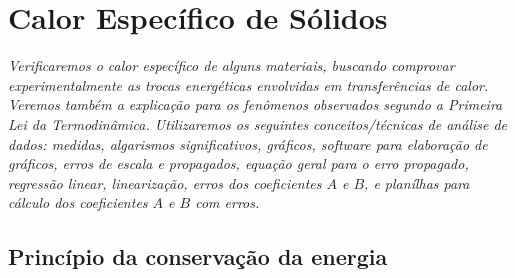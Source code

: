 \chapter{Calor Específico de Sólidos} %
\label{Chap:CalorEspecifico}        %

\begin{fullwidth}\it
Verificaremos o calor específico de alguns materiais, buscando comprovar experimentalmente as trocas energéticas envolvidas em transferências de calor. Veremos também a explicação para os fenômenos observados segundo a Primeira Lei da Termodinâmica. Utilizaremos os seguintes conceitos/técnicas de análise de dados: medidas, algarismos significativos, gráficos, software para elaboração de gráficos, erros de escala e propagados, equação geral para o erro propagado, regressão linear, linearização, erros dos coeficientes $A$ e $B$, e planílhas para cálculo dos coeficientes $A$ e $B$ com erros.
\end{fullwidth}

\section{Princípio da conservação da energia}







